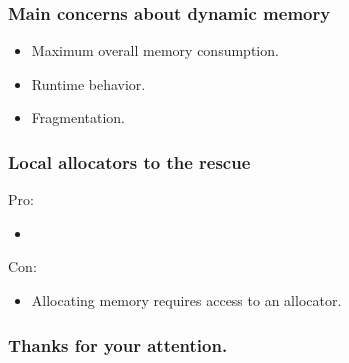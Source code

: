 \documentclass[aspectratio=43]{beamer}
\begin{document}
\begin{frame}[fragile]
  \frametitle{Main concerns about dynamic memory}
    \begin{itemize}
    \item Maximum overall memory consumption.
    \item Runtime behavior.
    \item Fragmentation.
    \end{itemize}
\end{frame}

\begin{frame}[fragile]
  \frametitle{Local allocators to the rescue}
    Pro:
    \begin{itemize}
    \item 
    \end{itemize}

    Con:
    \begin{itemize}
    \item Allocating memory requires access to an allocator.
    \end{itemize}
\end{frame}
\fi

\begin{frame}
  \frametitle{Thanks for your attention.}
\end{frame}
\end{document}

